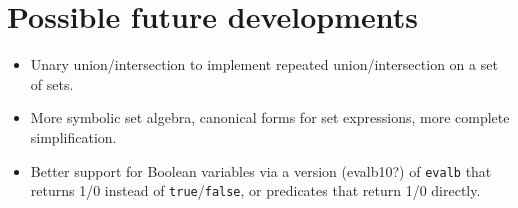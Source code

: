 \section{Possible future developments}

\begin{itemize}
\item Unary union/intersection to implement repeated
  union/intersection on a set of sets.
\item More symbolic set algebra, canonical forms for set expressions,
  more complete simplification.
\item Better support for Boolean variables via a version (evalb10?)
  of {\tt evalb} that returns 1/0 instead of {\tt true}/{\tt false},
  or predicates that return 1/0 directly.
\end{itemize}


